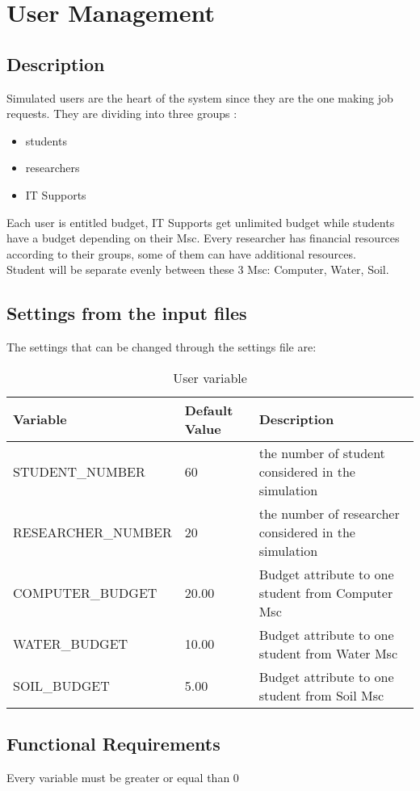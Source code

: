 \documentclass{scrreprt}
\begin{document}
\section{User Management}


\subsection{Description}
Simulated users are the heart of the system since they are the one making job requests. They are dividing into three groups :
\begin{itemize}
\item students
\item researchers
\item IT Supports
\end{itemize}
Each user is entitled budget, IT Supports get unlimited budget while students have a budget depending on their Msc. Every researcher has financial resources according to their groups, some of them can have additional resources.\\
Student will be separate evenly between these 3 Msc: Computer, Water, Soil.

\subsection{Settings from the input files}
The settings that can be changed through the settings file are:

\begin{table}[ht]
\centering
\caption{User variable}
\begin {tabular}{ l l l}
\toprule
Variable & Default Value & Description \\
\midrule
\midrule
 STUDENT_NUMBER & 60  & the number of student considered in the simulation \\
 RESEARCHER_NUMBER & 20 & the number of researcher considered in the simulation \\
 COMPUTER_BUDGET & 20.00  & Budget attribute to one student from Computer Msc \\
 WATER_BUDGET & 10.00  & Budget attribute to one student from Water Msc \\
 SOIL_BUDGET & 5.00  & Budget attribute to one student from Soil Msc \\
\bottomrule
\end {tabular}
\end{table}


\subsection{Functional Requirements}
Every variable must be greater or equal than 0
\end{document}
